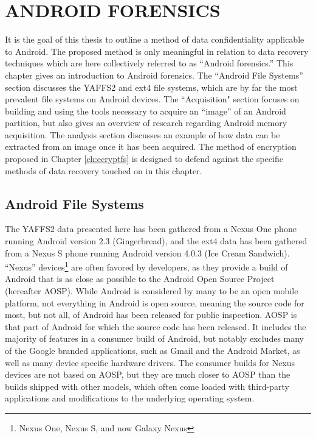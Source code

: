\chapter{ANDROID FORENSICS}
\label{ch:forensics}
It is the goal of this thesis to outline a method of data confidentiality applicable to Android. The proposed method is only
meaningful in relation to data recovery techniques which are here collectively referred to as ``Android forensics.'' This chapter
gives an introduction to Android forensics.  The ``Android File Systems'' section discusses the YAFFS2 and ext4 file systems, which
are by far the most prevalent file systems on Android devices.  The ``Acquisition" section focuses on building and using the tools
necessary to acquire an ``image'' of an Android partition, but also gives an overview of research regarding Android memory
acquisition. The analysis section discusses an example of how data can be extracted from an image once it has been acquired.  The
method of encryption proposed in Chapter \ref{ch:ecryptfs} is designed to defend against the specific methods of data
recovery touched on in this chapter.

\section{Android File Systems}

The YAFFS2 data presented here has been gathered from a Nexus One phone running Android version 2.3 (Gingerbread), and the
ext4 data has been gathered from a Nexus S phone running Android version 4.0.3 (Ice Cream Sandwich).  ``Nexus''
devices\footnote{Nexus One, Nexus S, and now Galaxy Nexus} are often favored by developers, as they provide a build of Android that
is as close as possible to the Android Open Source Project (hereafter AOSP). While Android is considered by many to be an open
mobile platform, not everything in Android is open source, meaning the source code for most, but not all, of Android has been
released for public inspection.  AOSP is that part of Android for which the source code has been released.  It includes the majority
of features in a consumer build of Android, but notably excludes many of the Google branded applications, such as Gmail and the
Android Market, as well as many device specific hardware drivers. The consumer builds for Nexus devices are not based on AOSP, but
they are much closer to AOSP than the builds shipped with other models, which often come loaded with third-party applications and
modifications to the underlying operating system.

